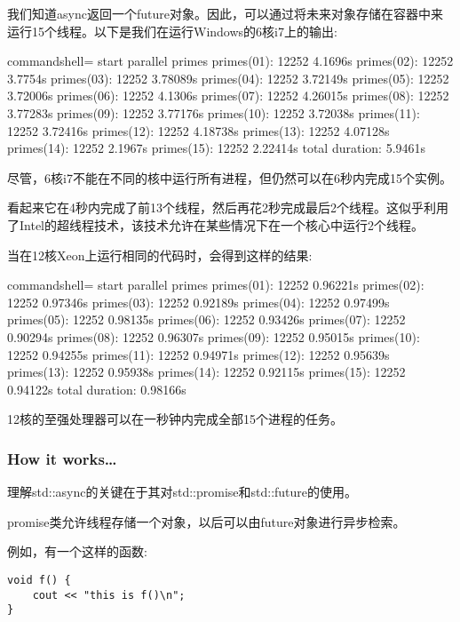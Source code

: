 \begin{itemize}
我们知道async返回一个future对象。因此，可以通过将未来对象存储在容器中来运行15个线程。以下是我们在运行Windows的6核i7上的输出:

\begin{tcblisting}{commandshell={}}
start parallel primes
primes(01): 12252 4.1696s
primes(02): 12252 3.7754s
primes(03): 12252 3.78089s
primes(04): 12252 3.72149s
primes(05): 12252 3.72006s
primes(06): 12252 4.1306s
primes(07): 12252 4.26015s
primes(08): 12252 3.77283s
primes(09): 12252 3.77176s
primes(10): 12252 3.72038s
primes(11): 12252 3.72416s
primes(12): 12252 4.18738s
primes(13): 12252 4.07128s
primes(14): 12252 2.1967s
primes(15): 12252 2.22414s
total duration: 5.9461s
\end{tcblisting}

尽管，6核i7不能在不同的核中运行所有进程，但仍然可以在6秒内完成15个实例。

看起来它在4秒内完成了前13个线程，然后再花2秒完成最后2个线程。这似乎利用了Intel的超线程技术，该技术允许在某些情况下在一个核心中运行2个线程。

当在12核Xeon上运行相同的代码时，会得到这样的结果:

\begin{tcblisting}{commandshell={}}
start parallel primes
primes(01): 12252 0.96221s
primes(02): 12252 0.97346s
primes(03): 12252 0.92189s
primes(04): 12252 0.97499s
primes(05): 12252 0.98135s
primes(06): 12252 0.93426s
primes(07): 12252 0.90294s
primes(08): 12252 0.96307s
primes(09): 12252 0.95015s
primes(10): 12252 0.94255s
primes(11): 12252 0.94971s
primes(12): 12252 0.95639s
primes(13): 12252 0.95938s
primes(14): 12252 0.92115s
primes(15): 12252 0.94122s
total duration: 0.98166s
\end{tcblisting}

12核的至强处理器可以在一秒钟内完成全部15个进程的任务。

\end{itemize}

\subsubsection{How it works…}

理解std::async的关键在于其对std::promise和std::future的使用。

promise类允许线程存储一个对象，以后可以由future对象进行异步检索。

例如，有一个这样的函数:

\begin{lstlisting}[style=styleCXX]
void f() {
	cout << "this is f()\n";
}
\end{lstlisting}

